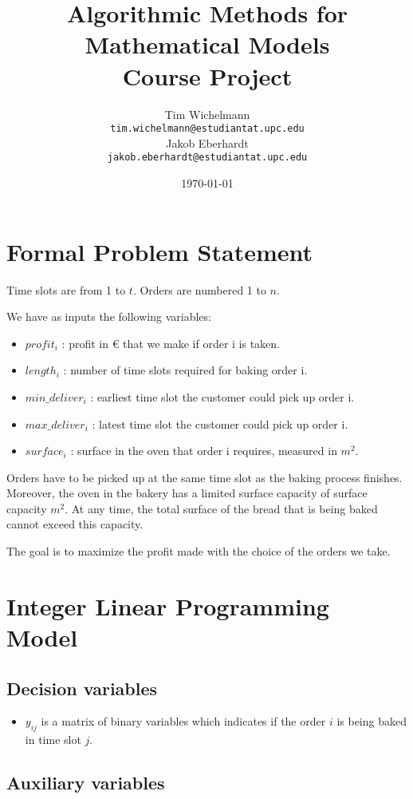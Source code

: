 \documentclass{article}
\title{Algorithmic Methods for Mathematical Models\\
  Course Project }
\author{Tim Wichelmann\\ \texttt{tim.wichelmann@estudiantat.upc.edu}\\[1ex] %
  Jakob Eberhardt\\ \texttt{jakob.eberhardt@estudiantat.upc.edu}}
\date{\today}
\begin{document}
\maketitle

\section{Formal Problem Statement}

Time slots are from 1 to $t$.
Orders are numbered 1 to $n$.

We have as inputs the following variables:
\begin{itemize}
    \item $profit_i$ : profit in \euro{ } that we make if order i is taken.
    \item $length_i$ : number of time slots required for baking order i.
    \item $min\_deliver_i$ : earliest time slot the customer could pick up order i.
    \item $max\_deliver_i$ : latest time slot the customer could pick up order i.
    \item $surface_i$ : surface in the oven that order i requires, measured in $m^2$.
\end{itemize}
Orders have to be picked up at the same time slot as the baking process finishes. 
Moreover, the oven in the bakery has a limited surface capacity of surface capacity $m^2$.
At any time, the total surface of the bread that is being baked cannot exceed this capacity.

The goal is to maximize the profit made with the choice of the orders we take.

\section{Integer Linear Programming Model}


\subsection{Decision variables}
\begin{itemize}
    \item $y_{ij}$ is a matrix of binary variables which indicates if the order $i$ is being baked in time slot $j$.
\end{itemize}

\subsection{Auxiliary variables}
\end{document}
